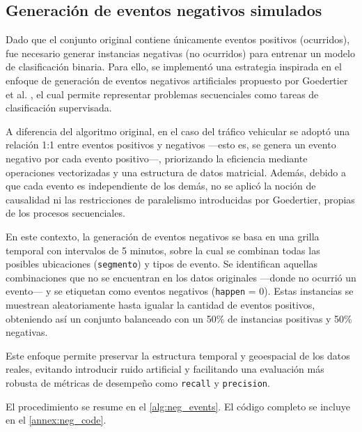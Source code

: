 \documentclass[12pt]{article}
\begin{document}
\subsection{Generación de eventos negativos simulados} \label{ssec:class_balancing}

Dado que el conjunto original contiene únicamente eventos positivos (ocurridos), fue necesario generar instancias negativas (no ocurridos) para entrenar un modelo de clasificación binaria. Para ello, se implementó una estrategia inspirada en el enfoque de generación de eventos negativos artificiales propuesto por Goedertier et al. \parencite{goedertier2009robust}, el cual permite representar problemas secuenciales como tareas de clasificación supervisada.

A diferencia del algoritmo original, en el caso del tráfico vehicular se adoptó una relación 1:1 entre eventos positivos y negativos —esto es, se genera un evento negativo por cada evento positivo—, priorizando la eficiencia mediante operaciones vectorizadas y una estructura de datos matricial. Además, debido a que cada evento es independiente de los demás, no se aplicó la noción de causalidad ni las restricciones de paralelismo introducidas por Goedertier, propias de los procesos secuenciales.

En este contexto, la generación de eventos negativos se basa en una grilla temporal con intervalos de 5 minutos, sobre la cual se combinan todas las posibles ubicaciones (\texttt{segmento}) y tipos de evento. Se identifican aquellas combinaciones que no se encuentran en los datos originales —donde no ocurrió un evento— y se etiquetan como eventos negativos (\texttt{happen} = 0). Estas instancias se muestrean aleatoriamente hasta igualar la cantidad de eventos positivos, obteniendo así un conjunto balanceado con un 50\% de instancias positivas y 50\% negativas.

Este enfoque permite preservar la estructura temporal y geoespacial de los datos reales, evitando introducir ruido artificial y facilitando una evaluación más robusta de métricas de desempeño como \texttt{recall} y \texttt{precision}.

El procedimiento se resume en el \autoref{alg:neg_events}. El código completo se incluye en el \autoref{annex:neg_code}.
\end{document}
